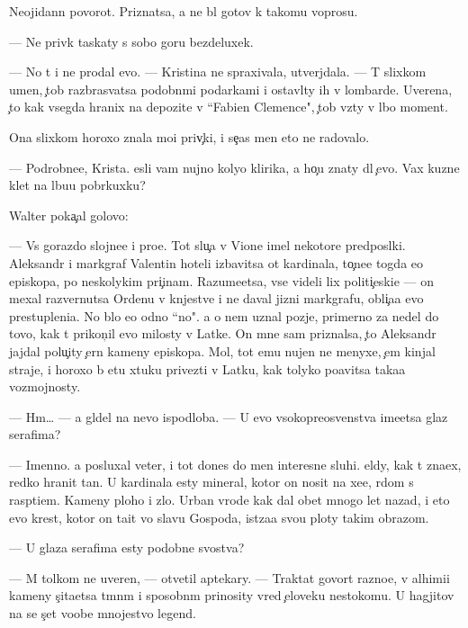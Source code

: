 \documentclass[10pt]{book}
\begin{document}
Neojidann{\yi}{\y} povorot. Priznatsa, {\y}a ne b{\yi}l gotov k takomu voprosu.

— Ne priv{\yi}k taskaty s sobo{\y} goru bezdeluxek.

— No t{\yi} i ne prodal {\y}evo. — Kristina ne spraxivala, utverjdala. — T{\yi} slixkom umen, {\c}tob{\yi} razbras{\yi}vatsa podobn{\yi}mi podarkami i ostavl{\ia}ty ih v lombarde. Uverena, {\c}to kak vsegda hranix na depozite v ``Fabien Clemence", {\c}tob{\yi} vz{\ia}ty v l{\iu}bo{\y} moment.

Ona slixkom horoxo znala mo{\y}i priv{\yi}{\c}ki, i se{\y}{\c}as men{\ia} eto ne radovalo.

— Podrobne{\y}e, Krista. {\Y}esli vam nujno koly{\q}o klirika, {\y}a ho{\c}u znaty dl{\ia} {\c}evo. Vax kuzne{\q} kl{\iu}{\y}et na l{\iu}bu{\y}u pobr{\ia}kuxku?

Walter poka{\c}al golovo{\y}:

— Vs{\e} gorazdo slojne{\y}e i pro{\x}e. Tot slu{\c}a{\y} v Vione imel nekotor{\yi}{\y}e predpos{\yi}lki. Aleksandr i markgraf Valentin hoteli izbavitsa ot kardinala, to{\c}ne{\y}e togda {\y}e{\x}o {\y}episkopa, po neskolykim pri{\c}inam. Razume{\y}etsa, vse videli lix politi{\c}eski{\y}e — on mexal razvernutsa Ordenu v kn{\ia}jestve i ne daval jizni markgrafu, obli{\c}a{\y}a {\y}evo prestupleni{\y}a. No b{\yi}lo {\y}e{\x}o odno ``no". {\Y}a o nem uznal pozje, primerno za nedel{\iu} do tovo, kak t{\yi} prikon{\c}il {\y}evo milosty v Latke. On mne sam priznalsa, {\c}to Aleksandr jajdal polu{\c}ity {\c}ern{\yi}{\y} kameny {\y}episkopa. Mol, tot {\y}emu nujen ne menyxe, {\c}em kinjal{\yi} straje{\y}, i horoxo b{\yi} etu xtuku privezti v Latku, kak tolyko po{\y}avitsa taka{\y}a vozmojnosty.

— Hm… — {\Y}a gl{\ia}del na nevo ispodlob{\y}a. — U {\y}evo v{\yi}sokopreosv{\ia}{\x}enstva ime{\y}etsa glaz serafima?

— Imenno. {\Y}a posluxal veter, i tot dones do men{\ia} interesn{\yi}{\y}e sluhi. {\C}el{\ia}dy, kak t{\yi} zna{\y}ex, redko hranit ta{\y}n{\yi}. U kardinala {\y}esty mineral, kotor{\yi}{\y} on nosit na xe{\y}e, r{\ia}dom s rasp{\ia}ti{\y}em. Kameny ploho{\y} i zlo{\y}. Urban vrode kak dal obet mnogo let nazad, i eto {\y}evo krest, kotor{\yi}{\y} on ta{\x}it vo slavu Gospoda, ist{\ia}za{\y}a svo{\y}u ploty takim obrazom.

— U glaza serafima {\y}esty podobn{\yi}{\y}e svo{\y}stva?

— M{\yi} tolkom ne uveren{\yi}, — otvetil aptekary. — Traktat{\yi} govor{\ia}t razno{\y}e, v alhimi{\y}i kameny s{\c}ita{\y}etsa t{\e}mn{\yi}m i sposobn{\yi}m prinosity vred {\c}eloveku nesto{\y}komu. U hagjitov na se{\y} s{\c}et voob{\x}e mnojestvo legend.
\end{document}
